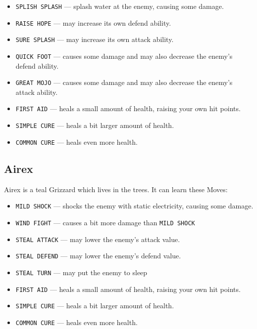 \documentclass[12pt,openright,book]{memoir}
\begin{document}
\begin{description}
\begin{itemize}
\item  \texttt{SPLISH SPLASH}  --- splash  water at  the enemy,  causing
  some damage. 
\item \texttt{RAISE HOPE} --- may increase its own defend ability.
\item \texttt{SURE SPLASH} --- may increase its own attack ability.
\item \texttt{QUICK FOOT}  --- causes some damage and  may also decrease
  the enemy's defend ability.
\item \texttt{GREAT MOJO}  --- causes some damage and  may also decrease
  the enemy's attack ability.
\item \texttt{FIRST  AID} ---  heals a small  amount of  health, raising
  your own hit points.
\item \texttt{SIMPLE CURE} --- heals a bit larger amount of health.
\item \texttt{COMMON CURE} --- heals even more health.
\end{itemize}

\ifdefined\DEMO\else

\subsection{Airex}

Airex is a teal Grizzard which lives in the trees. It can learn these Moves:

\begin{itemize}
\item \texttt{MILD SHOCK} --- shocks  the enemy with static electricity,
  causing some damage.
\item \texttt{WIND FIGHT} --- causes a bit more damage than \texttt{MILD SHOCK}
\item \texttt{STEAL ATTACK} --- may lower the enemy's attack value.
\item \texttt{STEAL DEFEND} --- may lower the enemy's defend value.
\item \texttt{STEAL TURN} --- may put the enemy to sleep
\item \texttt{FIRST  AID} ---  heals a small  amount of  health, raising
  your own hit points.
\item \texttt{SIMPLE CURE} --- heals a bit larger amount of health.
\item \texttt{COMMON CURE} --- heals even more health.
\end{itemize}

\fi


\end{description}
\end{document}
